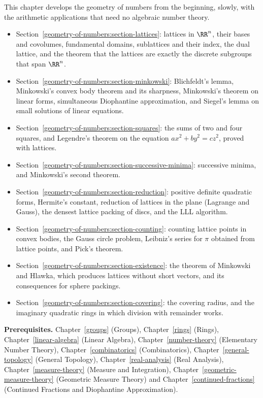 This chapter develops the geometry of numbers from the beginning, slowly, with the arithmetic applications that need no algebraic number theory.
\begin{itemize}
\item Section~\ref{geometry-of-numbers:section-lattices}: lattices in $\RR^n$, their bases and covolumes, fundamental domains, sublattices and their index, the dual lattice, and the theorem that the
lattices are exactly the discrete subgroups that span $\RR^n$.
\item Section~\ref{geometry-of-numbers:section-minkowski}: Blichfeldt's lemma, Minkowski's convex body theorem and its sharpness, Minkowski's theorem on linear forms, simultaneous Diophantine
approximation, and Siegel's lemma on small solutions of linear equations.
\item Section~\ref{geometry-of-numbers:section-squares}: the sums of two and four squares, and Legendre's theorem on the equation $ax^2 + by^2 = cz^2$, proved with lattices.
\item Section~\ref{geometry-of-numbers:section-successive-minima}: successive minima, and Minkowski's second theorem.
\item Section~\ref{geometry-of-numbers:section-reduction}: positive definite quadratic forms, Hermite's constant, reduction of lattices in the plane (Lagrange and Gauss), the densest lattice packing
of discs, and the LLL algorithm.
\item Section~\ref{geometry-of-numbers:section-counting}: counting lattice points in convex bodies, the Gauss circle problem, Leibniz's series for $\pi$ obtained from lattice points, and Pick's theorem.
\item Section~\ref{geometry-of-numbers:section-existence}: the theorem of Minkowski and Hlawka, which produces lattices without short vectors, and its consequences for sphere packings.
\item Section~\ref{geometry-of-numbers:section-covering}: the covering radius, and the imaginary quadratic rings in which division with remainder works.
\end{itemize}

\noindent\textbf{Prerequisites.} Chapter~\ref{groups} (Groups), Chapter~\ref{rings} (Rings), Chapter~\ref{linear-algebra} (Linear Algebra), Chapter~\ref{number-theory} (Elementary Number
Theory), Chapter~\ref{combinatorics} (Combinatorics), Chapter~\ref{general-topology} (General Topology), Chapter~\ref{real-analysis} (Real Analysis), Chapter~\ref{measure-theory} (Measure and
Integration), Chapter~\ref{geometric-measure-theory} (Geometric Measure Theory) and Chapter~\ref{continued-fractions} (Continued Fractions and Diophantine Approximation).

